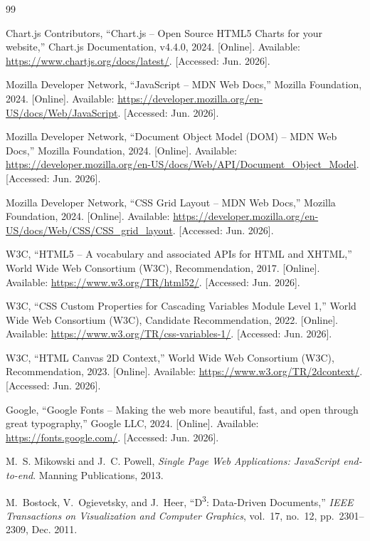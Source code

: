 \documentclass{book}
\begin{document}
\begin{thebibliography}{99}

Chart.js Contributors, ``Chart.js -- Open Source HTML5 Charts for your website,'' Chart.js Documentation, v4.4.0, 2024. [Online]. Available: \url{https://www.chartjs.org/docs/latest/}. [Accessed: Jun. 2026].

Mozilla Developer Network, ``JavaScript -- MDN Web Docs,'' Mozilla Foundation, 2024. [Online]. Available: \url{https://developer.mozilla.org/en-US/docs/Web/JavaScript}. [Accessed: Jun. 2026].

Mozilla Developer Network, ``Document Object Model (DOM) -- MDN Web Docs,'' Mozilla Foundation, 2024. [Online]. Available: \url{https://developer.mozilla.org/en-US/docs/Web/API/Document_Object_Model}. [Accessed: Jun. 2026].

Mozilla Developer Network, ``CSS Grid Layout -- MDN Web Docs,'' Mozilla Foundation, 2024. [Online]. Available: \url{https://developer.mozilla.org/en-US/docs/Web/CSS/CSS_grid_layout}. [Accessed: Jun. 2026].

W3C, ``HTML5 -- A vocabulary and associated APIs for HTML and XHTML,'' World Wide Web Consortium (W3C), Recommendation, 2017. [Online]. Available: \url{https://www.w3.org/TR/html52/}. [Accessed: Jun. 2026].

W3C, ``CSS Custom Properties for Cascading Variables Module Level 1,'' World Wide Web Consortium (W3C), Candidate Recommendation, 2022. [Online]. Available: \url{https://www.w3.org/TR/css-variables-1/}. [Accessed: Jun. 2026].

W3C, ``HTML Canvas 2D Context,'' World Wide Web Consortium (W3C), Recommendation, 2023. [Online]. Available: \url{https://www.w3.org/TR/2dcontext/}. [Accessed: Jun. 2026].

Google, ``Google Fonts -- Making the web more beautiful, fast, and open through great typography,'' Google LLC, 2024. [Online]. Available: \url{https://fonts.google.com/}. [Accessed: Jun. 2026].

M.~S. Mikowski and J.~C. Powell, \textit{Single Page Web Applications: JavaScript end-to-end}. Manning Publications, 2013.

M.~Bostock, V.~Ogievetsky, and J.~Heer, ``D\textsuperscript{3}: Data-Driven Documents,'' \textit{IEEE Transactions on Visualization and Computer Graphics}, vol.~17, no.~12, pp.~2301--2309, Dec. 2011.


\end{thebibliography}
\end{document}
